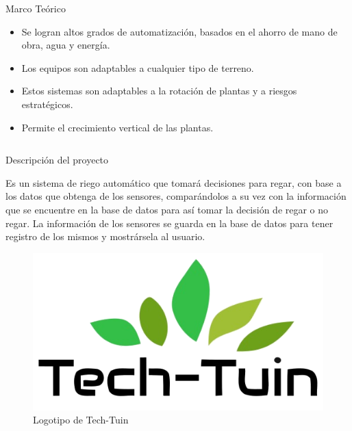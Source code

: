 \documentclass{beamer}
\begin{document}
\begin{frame}[fragile]{}
\begin{columns}[t]
\begin{column}{0.96\textwidth}
\begin{block}{Marco Teórico}
\begin{itemize}

\item Se logran altos grados de automatización, basados en el ahorro de mano de obra, agua y energía.
\item Los equipos son adaptables a cualquier tipo de terreno.
\item Estos sistemas son adaptables a la rotación de plantas y a riesgos estratégicos.
\item Permite el crecimiento vertical de las plantas.

\end{itemize}
    \end{block}
  \end{column}
\end{columns}


\justifying
\begin{columns}[t]
	
	
	  \begin{column}{0.46\textwidth}
	  	\begin{block}{Descripción del proyecto}
	  		\begin{minipage}[t]{1\linewidth}
	  			\vspace{0pt} 
	  			Es un sistema de riego automático que tomará decisiones para regar, con base a los datos que obtenga de los sensores, comparándolos a su vez con la información que se encuentre en la base de datos para así tomar la decisión de regar o no regar. La información de los sensores se guarda en la base de datos para tener registro de los mismos y mostrársela al usuario.
	  			\begin{figure}[H]
	  				\centering
	  				\includegraphics[scale=4]{../graphics/logop}
	  				\caption{Logotipo de Tech-Tuin}
	  			\end{figure}


\end{minipage}
\end{block}
\end{column}
\end{columns}
\end{frame}
\end{document}
